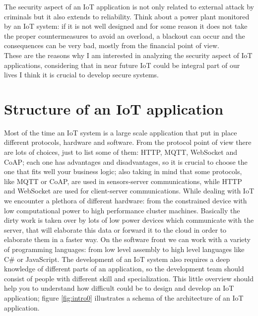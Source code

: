 	The security aspect of an IoT application is not only related to external attack by criminals but it also extends to reliability. Think about a power plant monitored by
	an IoT system: if it is not well designed and for some reason it does not take the proper countermeasures to avoid an overload, a blackout can occur and the consequences can be very bad, mostly from the financial point of view.\\
	These are the reasons why I am interested in analyzing the security aspect of IoT applications, considering that in near future
	IoT could be integral part of our lives I think it is crucial to develop secure systems.
	
	
	\section{Structure of an IoT application}
	Most of the time an IoT system is a large scale application that put in place different protocols, hardware and software.\newline
	From the protocol point of view there are lots of choices, just to list some of them: HTTP, MQTT, WebSocket and CoAP;
	each one has advantages and disadvantages, so it is crucial to choose the one that fits well your business logic; also taking in mind
	that some protocols, like MQTT or CoAP, are used in sensors-server communications, while HTTP and WebSocket
	are used for client-server communications.\newline
	While dealing with IoT we encounter a plethora of different hardware: from the constrained device with low computational power to
	high performance cluster machines. Basically the dirty work is taken over by lots of low power devices which communicate with the server,
	that will elaborate this data or forward it to the cloud in order to elaborate them in a faster way.\newline
	On the software front we can work with a variety of programming languages: from low level assembly to high level languages like C\# or JavaScript.\newline
	The development of an IoT system also requires a deep knowledge of different parts of an application, so the development team
	should consist of people with different skill and specialization.\newline
	This little overview should help you to understand how difficult could be to design and develop an IoT application; figure \ref{fig:intro0} illustrates a schema of the architecture of an IoT application.\newline
	
